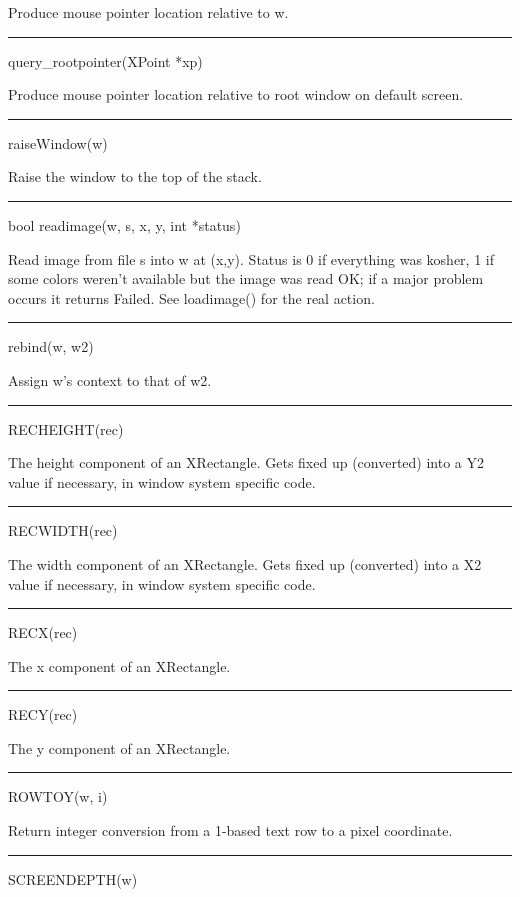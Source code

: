 Produce mouse pointer location relative to w.


\bigskip\hrule\vspace{0.1cm}
\noindent
query\_rootpointer(XPoint *xp)


Produce mouse pointer location relative to root window on default screen.


\bigskip\hrule\vspace{0.1cm}
\noindent
raiseWindow(w)


Raise the window to the top of the stack.


\bigskip\hrule\vspace{0.1cm}
\noindent
bool readimage(w, s, x, y, int *status)


Read image from file s into w at (x,y). Status is 0 if everything was
kosher, 1 if some colors weren't available but the image was read OK;
if a major problem occurs it returns Failed. See loadimage() for the
real action.


\bigskip\hrule\vspace{0.1cm}
\noindent
rebind(w, w2)


Assign w's context to that of w2.


\bigskip\hrule\vspace{0.1cm}
\noindent
RECHEIGHT(rec)


The height component of an XRectangle. Gets {\textquotedbl}fixed
up{\textquotedbl} (converted) into a Y2 value if necessary, in window
system specific code.


\bigskip\hrule\vspace{0.1cm}
\noindent
RECWIDTH(rec)


The width component of an XRectangle. Gets {\textquotedbl}fixed
up{\textquotedbl} (converted) into a X2 value if necessary, in window
system specific code.


\bigskip\hrule\vspace{0.1cm}
\noindent
RECX(rec)


The x component of an XRectangle.


\bigskip\hrule\vspace{0.1cm}
\noindent
RECY(rec)


The y component of an XRectangle.


\bigskip\hrule\vspace{0.1cm}
\noindent
ROWTOY(w, i)


Return integer conversion from a 1-based text row to a pixel coordinate.


\bigskip\hrule\vspace{0.1cm}
\noindent
SCREENDEPTH(w)


